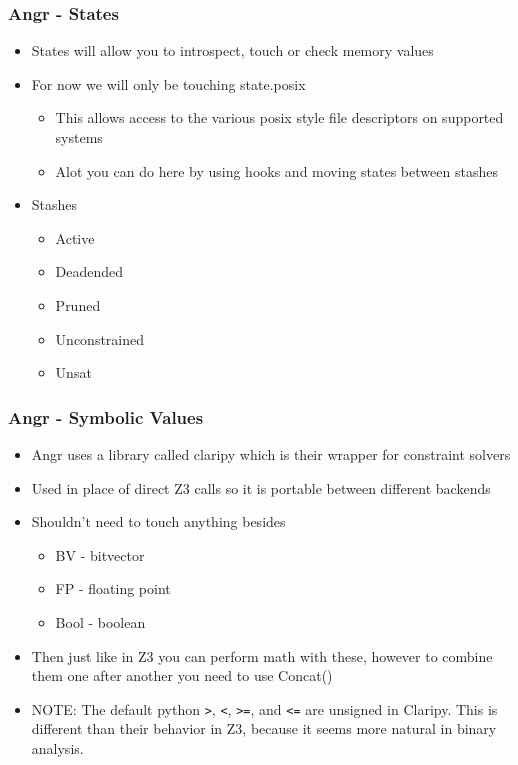 \documentclass[aspectratio=169]{beamer}
\begin{document}
\begin{frame}[fragile]
\frametitle{Angr - States}
\begin{itemize}
\item States will allow you to introspect, touch or check memory values
\item For now we will only be touching state.posix
\begin{itemize}
\item This allows access to the various posix style file descriptors on supported systems
\item Alot you can do here by using hooks and moving states between stashes
\end{itemize}
\item Stashes
\begin{itemize}
\item Active
\item Deadended
\item Pruned
\item Unconstrained
\item Unsat
\end{itemize}
\end{itemize}
\end{frame}

\begin{frame}[fragile]
\frametitle{Angr - Symbolic Values}
\begin{itemize}
\item Angr uses a library called claripy which is their wrapper for constraint solvers
\item Used in place of direct Z3 calls so it is portable between different backends
\item Shouldn't need to touch anything besides
\begin{itemize}
\item BV - bitvector
\item FP - floating point
\item Bool - boolean
\end{itemize}
\item Then just like in Z3 you can perform math with these, however to combine them one after another you need to use Concat()
\item NOTE: The default python \verb|>|, \verb|<|, \verb|>=|, and \verb|<=| are unsigned in Claripy. This is different than their behavior in Z3, because it seems more natural in binary analysis.
\end{itemize}
\end{frame}
\end{document}
